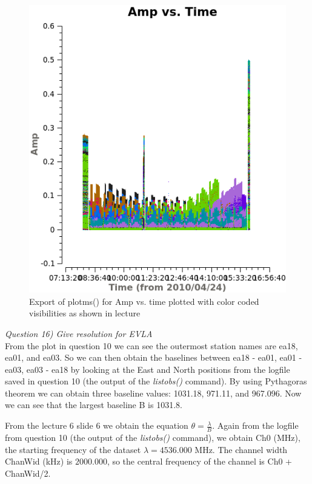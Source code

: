 \documentclass[12pt, a4paper]{article}
\begin{document}
\begin{figure}
    \centering
    \includegraphics[scale=0.65]{../Imaging/plots/amp_vs_time_vraag15.png}
    \caption{Export of plotms() for Amp vs. time plotted with color coded visibilities as shown in lecture \label{fig:15}}
\end{figure}

\noindent \textit{Question 16) Give resolution for EVLA} \\
From the plot in question 10 we can see the outermost station names are ea18, ea01, and ea03. So we can then obtain the baselines between ea18 - ea01, ea01 - ea03, ea03 - ea18 by looking at the East and North positions from the logfile saved in question 10 (the output of the \emph{listobs()} command). By using Pythagoras theorem we can obtain three baseline values: 1031.18, 971.11, and 967.096. Now we can see that the largest baseline B is 1031.8.

From the lecture 6 slide 6 we obtain the equation $\theta = \frac{\lambda}{B}$. Again from the logfile from question 10 (the output of the \emph{listobs()} command), we obtain Ch0 (MHz), the starting frequency of the dataset $\lambda = 4536.000$ MHz. The channel width ChanWid (kHz) is $2000.000$, so the central frequency of the channel is Ch0 + ChanWid/2.
\end{document}
